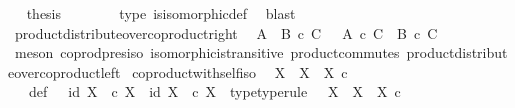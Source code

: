 \begin{isabellebody}
\ \isamarkupfalse%
\ {\isacharquery}{\kern0pt}thesis\isanewline
\ \ \ \ \ \ \isamarkupfalse%
\ {\isasymphi}{\isacharunderscore}{\kern0pt}type\ is{\isacharunderscore}{\kern0pt}isomorphic{\isacharunderscore}{\kern0pt}def\ \isamarkupfalse%
\ blast\isanewline
{}\isamarkupfalse%
%
\endisatagproof
{\isafoldproof}%
%
\isadelimproof
\ \isanewline
%
\endisadelimproof
\isanewline
{}\isamarkupfalse%
\ product{\isacharunderscore}{\kern0pt}distribute{\isacharunderscore}{\kern0pt}over{\isacharunderscore}{\kern0pt}coproduct{\isacharunderscore}{\kern0pt}right{\isacharcolon}{\kern0pt}\isanewline
\ \ {\isachardoublequoteopen}{\isacharparenleft}{\kern0pt}A\ {\isasymCoprod}\ B{\isacharparenright}{\kern0pt}\ {\isasymtimes}\isactrlsub c\ C\ \ {\isasymcong}\ {\isacharparenleft}{\kern0pt}A\ {\isasymtimes}\isactrlsub c\ C{\isacharparenright}{\kern0pt}\ {\isasymCoprod}\ {\isacharparenleft}{\kern0pt}B\ {\isasymtimes}\isactrlsub c\ C{\isacharparenright}{\kern0pt}{\isachardoublequoteclose}\isanewline
%
\isadelimproof
\ \ %
\endisadelimproof
%
\isatagproof
{}\isamarkupfalse%
\ {\isacharparenleft}{\kern0pt}meson\ coprod{\isacharunderscore}{\kern0pt}pres{\isacharunderscore}{\kern0pt}iso\ isomorphic{\isacharunderscore}{\kern0pt}is{\isacharunderscore}{\kern0pt}transitive\ product{\isacharunderscore}{\kern0pt}commutes\ product{\isacharunderscore}{\kern0pt}distribute{\isacharunderscore}{\kern0pt}over{\isacharunderscore}{\kern0pt}coproduct{\isacharunderscore}{\kern0pt}left{\isacharparenright}{\kern0pt}%
\endisatagproof
{\isafoldproof}%
%
\isadelimproof
\isanewline
%
\endisadelimproof
\isanewline
{}\isamarkupfalse%
\ coproduct{\isacharunderscore}{\kern0pt}with{\isacharunderscore}{\kern0pt}self{\isacharunderscore}{\kern0pt}iso{\isacharcolon}{\kern0pt}\isanewline
\ \ {\isachardoublequoteopen}X\ {\isasymCoprod}\ X\ {\isasymcong}\ X\ {\isasymtimes}\isactrlsub c\ {\isasymOmega}{\isachardoublequoteclose}\isanewline
%
\isadelimproof
%
\endisadelimproof
%
\isatagproof
{}\isamarkupfalse%
\ {\isacharminus}{\kern0pt}\ \isanewline
\ \ \isamarkupfalse%
\ {\isasymrho}\ \ {\isasymrho}{\isacharunderscore}{\kern0pt}def{\isacharcolon}{\kern0pt}\ {\isachardoublequoteopen}{\isasymrho}\ {\isacharequal}{\kern0pt}\ {\isasymlangle}id\ X{\isacharcomma}{\kern0pt}\ {\isasymt}\ {\isasymcirc}\isactrlsub c\ {\isasymbeta}\isactrlbsub X\isactrlesub {\isasymrangle}\ {\isasymamalg}\ {\isasymlangle}id\ X{\isacharcomma}{\kern0pt}\ {\isasymf}\ {\isasymcirc}\isactrlsub c\ {\isasymbeta}\isactrlbsub X\isactrlesub {\isasymrangle}{\isachardoublequoteclose}\ \ {\isasymrho}{\isacharunderscore}{\kern0pt}type{\isacharbrackleft}{\kern0pt}type{\isacharunderscore}{\kern0pt}rule{\isacharbrackright}{\kern0pt}{\isacharcolon}{\kern0pt}\ {\isachardoublequoteopen}{\isasymrho}\ {\isacharcolon}{\kern0pt}\ X\ {\isasymCoprod}\ X\ {\isasymrightarrow}\ X\ {\isasymtimes}\isactrlsub c\ {\isasymOmega}{\isachardoublequoteclose}\isanewline

\end{isabellebody}
